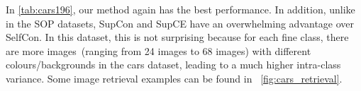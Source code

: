 \documentclass[10pt,twocolumn,letterpaper]{article}
\begin{document}
In \cref{tab:cars196}, our method again has the best performance. In addition, unlike in the SOP datasets, SupCon and SupCE have an overwhelming advantage over SelfCon. In this dataset, this is not surprising because for each fine class, there are more images~(ranging from 24 images to 68 images) with different colours/backgrounds in the cars dataset, leading to a much higher intra-class variance. Some image retrieval examples can be found in ~\cref{fig:cars_retrieval}.
\begin{table}[htbp]
\centering
{}
\caption{Results on Stanford Cars196 dataset.}
\label{tab:cars196}
\end{table}
\vspace{-5mm}
\end{document}
